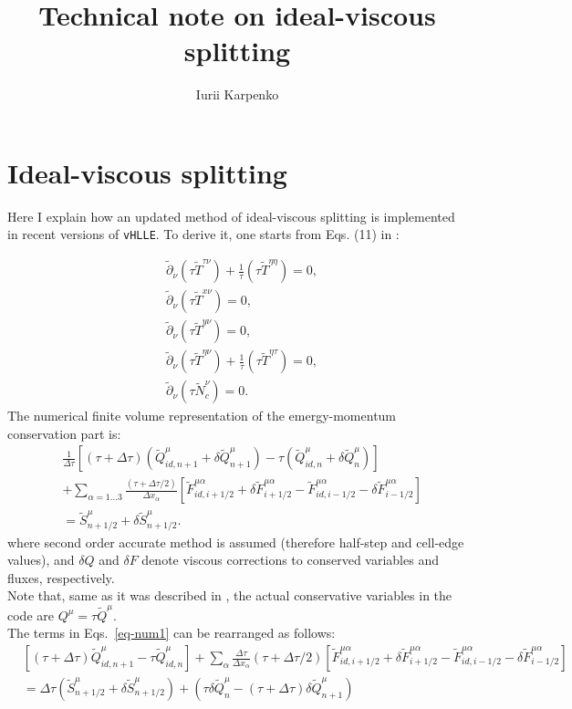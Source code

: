 \documentclass{article}
\title{Technical note on ideal-viscous splitting}
\author{Iurii Karpenko}
\newcommand{\dd}{\partial}
\begin{document}
\maketitle

\section{Ideal-viscous splitting}

Here I explain how an updated method of ideal-viscous splitting is implemented in recent versions of \texttt{vHLLE}. To derive it, one starts from Eqs. (11) in \cite{Karpenko:2013wva}:

 \begin{align}\label{eqns1}
 &\tilde\dd_\nu(\tau \tilde T^{\tau\nu})+\frac{1}{\tau}(\tau \tilde T^{\eta\eta})=0, \nonumber\\
 &\tilde\dd_\nu (\tau \tilde T^{x\nu}) = 0, \nonumber\\
 &\tilde\dd_\nu (\tau \tilde T^{y\nu}) = 0,\\
 &\tilde\dd_\nu(\tau \tilde T^{\eta\nu}) + \frac{1}{\tau} (\tau \tilde T^{\eta\tau}) = 0, \nonumber\\
 &\tilde\dd_\nu(\tau \tilde N_c^\nu)=0. \nonumber
 \end{align}
The numerical finite volume representation of the emergy-momentum conservation part is:
\begin{align}\label{eq-num1}
&\frac{1}{\Delta\tau}\left[ (\tau+\Delta\tau)(\tilde  Q^\mu_{id,n+1}+\delta \tilde Q^\mu_{n+1}) - \tau (\tilde Q^\mu_{id,n}+\delta \tilde Q^\mu_n) \right] \nonumber\\
&+\sum_{\alpha=1...3}\frac{(\tau+\Delta\tau/2)}{\Delta x_\alpha}\left[ \tilde F^{\mu\alpha}_{id,i+1/2}+\delta \tilde F^{\mu\alpha}_{i+1/2} - \tilde F^{\mu\alpha}_{id,i-1/2}-\delta \tilde F^{\mu\alpha}_{i-1/2} \right] \nonumber\\
&=\tilde S^\mu_{n+1/2}+\delta \tilde S^\mu_{n+1/2}.
\end{align}
where second order accurate method is assumed (therefore half-step and cell-edge values), and $\delta Q$ and $\delta F$ denote viscous corrections to conserved variables and fluxes, respectively.\\
Note that, same as it was described in \cite{Karpenko:2013wva}, the actual conservative variables in the code are $Q^\mu=\tau\tilde Q^\mu$.\\
The terms in Eqs.~\ref{eq-num1} can be rearranged as follows:
\begin{align}
&\left[ (\tau+\Delta\tau)\tilde Q^\mu_{id,n+1} - \tau \tilde Q^\mu_{id,n} \right]
+\sum_{\alpha}\frac{\Delta\tau}{\Delta x_\alpha}(\tau+\Delta\tau/2)\left[ \tilde F^{\mu\alpha}_{id,i+1/2}+\delta \tilde F^{\mu\alpha}_{i+1/2} - \tilde F^{\mu\alpha}_{id,i-1/2}-\delta \tilde F^{\mu\alpha}_{i-1/2} \right] \nonumber\\
&=\Delta\tau(\tilde S^\mu_{n+1/2}+\delta \tilde S^\mu_{n+1/2}) + (\tau\delta \tilde Q^\mu_n - (\tau+\Delta\tau)\delta \tilde Q^\mu_{n+1})
\end{align}
\end{document}

